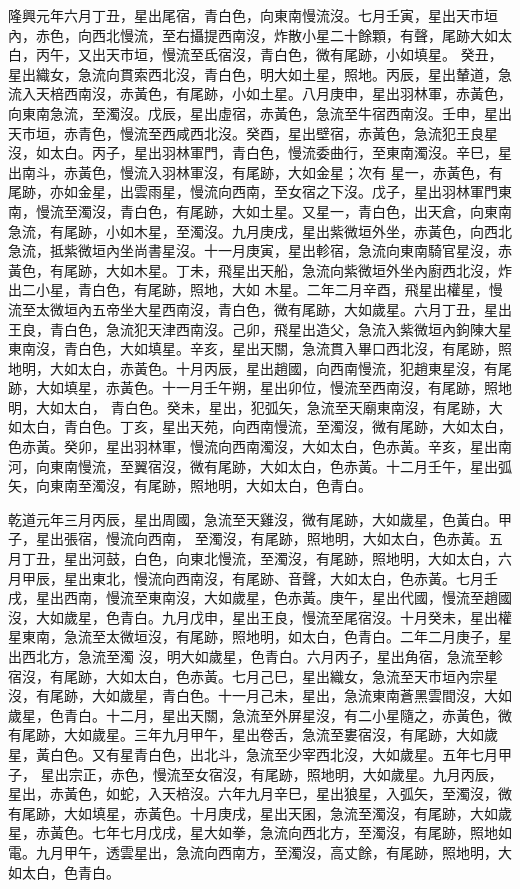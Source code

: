 \begin{pinyinscope}
 隆興元年六月丁丑，星出尾宿，青白色，向東南慢流沒。七月壬寅，星出天市垣內，赤色，向西北慢流，至右攝提西南沒，炸散小星二十餘顆，有聲，尾跡大如太白，丙午，又出天市垣，慢流至氐宿沒，青白色，微有尾跡，小如填星。
 癸丑，星出織女，急流向貫索西北沒，青白色，明大如土星，照地。丙辰，星出輦道，急流入天棓西南沒，赤黃色，有尾跡，小如土星。八月庚申，星出羽林軍，赤黃色，向東南急流，至濁沒。戊辰，星出虛宿，赤黃色，急流至牛宿西南沒。壬申，星出天市垣，赤青色，慢流至西咸西北沒。癸酉，星出壁宿，赤黃色，急流犯王良星沒，如太白。丙子，星出羽林軍門，青白色，慢流委曲行，至東南濁沒。辛巳，星出南斗，赤黃色，慢流入羽林軍沒，有尾跡，大如金星；次有
 星一，赤黃色，有尾跡，亦如金星，出雲雨星，慢流向西南，至女宿之下沒。戊子，星出羽林軍門東南，慢流至濁沒，青白色，有尾跡，大如土星。又星一，青白色，出天倉，向東南急流，有尾跡，小如木星，至濁沒。九月庚戌，星出紫微垣外坐，赤黃色，向西北急流，抵紫微垣內坐尚書星沒。十一月庚寅，星出軫宿，急流向東南騎官星沒，赤黃色，有尾跡，大如木星。丁未，飛星出天船，急流向紫微垣外坐內廚西北沒，炸出二小星，青白色，有尾跡，照地，大如
 木星。二年二月辛酉，飛星出權星，慢流至太微垣內五帝坐大星西南沒，青白色，微有尾跡，大如歲星。六月丁丑，星出王良，青白色，急流犯天津西南沒。己卯，飛星出造父，急流入紫微垣內鉤陳大星東南沒，青白色，大如填星。辛亥，星出天關，急流貫入畢口西北沒，有尾跡，照地明，大如太白，赤黃色。十月丙辰，星出趙國，向西南慢流，犯趙東星沒，有尾跡，大如填星，赤黃色。十一月壬午朔，星出卯位，慢流至西南沒，有尾跡，照地明，大如太白，
 青白色。癸未，星出，犯弧矢，急流至天廟東南沒，有尾跡，大如太白，青白色。丁亥，星出天苑，向西南慢流，至濁沒，微有尾跡，大如太白，色赤黃。癸卯，星出羽林軍，慢流向西南濁沒，大如太白，色赤黃。辛亥，星出南河，向東南慢流，至翼宿沒，微有尾跡，大如太白，色赤黃。十二月壬午，星出弧矢，向東南至濁沒，有尾跡，照地明，大如太白，色青白。



 乾道元年三月丙辰，星出周國，急流至天雞沒，微有尾跡，大如歲星，色黃白。甲子，星出張宿，慢流向西南，
 至濁沒，有尾跡，照地明，大如太白，色赤黃。五月丁丑，星出河鼓，白色，向東北慢流，至濁沒，有尾跡，照地明，大如太白，六月甲辰，星出東北，慢流向西南沒，有尾跡、音聲，大如太白，色赤黃。七月壬戌，星出西南，慢流至東南沒，大如歲星，色赤黃。庚午，星出代國，慢流至趙國沒，大如歲星，色青白。九月戊申，星出王良，慢流至尾宿沒。十月癸未，星出權星東南，急流至太微垣沒，有尾跡，照地明，如太白，色青白。二年二月庚子，星出西北方，急流至濁
 沒，明大如歲星，色青白。六月丙子，星出角宿，急流至軫宿沒，有尾跡，大如太白，色赤黃。七月己巳，星出織女，急流至天市垣內宗星沒，有尾跡，大如歲星，青白色。十一月己未，星出，急流東南蒼黑雲間沒，大如歲星，色青白。十二月，星出天關，急流至外屏星沒，有二小星隨之，赤黃色，微有尾跡，大如歲星。三年九月甲午，星出卷舌，急流至婁宿沒，有尾跡，大如歲星，黃白色。又有星青白色，出北斗，急流至少宰西北沒，大如歲星。五年七月甲子，
 星出宗正，赤色，慢流至女宿沒，有尾跡，照地明，大如歲星。九月丙辰，星出，赤黃色，如蛇，入天棓沒。六年九月辛巳，星出狼星，入弧矢，至濁沒，微有尾跡，大如填星，赤黃色。十月庚戌，星出天囷，急流至濁沒，有尾跡，大如歲星，赤黃色。七年七月戊戌，星大如拳，急流向西北方，至濁沒，有尾跡，照地如電。九月甲午，透雲星出，急流向西南方，至濁沒，高丈餘，有尾跡，照地明，大如太白，色青白。




\end{pinyinscope}
